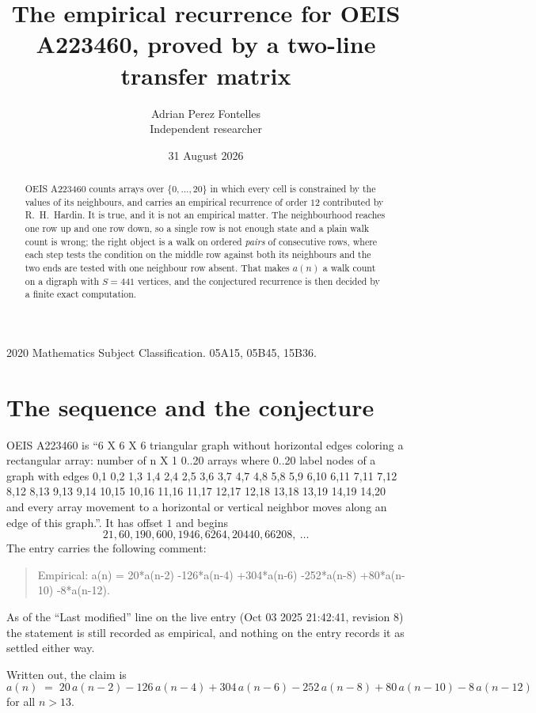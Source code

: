 \documentclass[11pt,a4paper]{article}
\title{The empirical recurrence for OEIS A223460, proved by a two-line transfer matrix}
\author{Adrian Perez Fontelles\\ \small Independent researcher}
\date{31 August 2026}
\theoremstyle{plain}
\theoremstyle{definition}
\begin{document}
\maketitle

\begin{abstract}
OEIS A223460 counts arrays over $\{0,\dots,20\}$ in which every cell is constrained by the
values of its neighbours, and carries an empirical recurrence of order $12$ contributed
by R.~H.~Hardin. It is true, and it is not an empirical matter. The neighbourhood reaches one
row up and one row down, so a single row is not enough state and a plain walk count
is wrong; the right object is a walk on ordered \emph{pairs} of consecutive rows, where
each step tests the condition on the middle row against both its neighbours and the two
ends are tested with one neighbour row absent. That makes $a(n)$ a walk count on a digraph
with $S=441$ vertices, and the conjectured recurrence is then decided by a finite exact
computation.
\end{abstract}

\noindent\small 2020 Mathematics Subject Classification. 05A15, 05B45, 15B36.\normalsize

\section{The sequence and the conjecture}

OEIS A223460 is ``6 X 6 X 6 triangular graph without horizontal edges coloring a rectangular array: number of n X 1 0..20 arrays where 0..20 label nodes of a graph with edges 0,1 0,2 1,3 1,4 2,4 2,5 3,6 3,7 4,7 4,8 5,8 5,9 6,10 6,11 7,11 7,12 8,12 8,13 9,13 9,14 10,15 10,16 11,16 11,17 12,17 12,18 13,18 13,19 14,19 14,20 and every array movement to a horizontal or vertical neighbor moves along an edge of this graph.''. It has offset $1$ and begins
\[
21, 60, 190, 600, 1946, 6264, 20440, 66208,\ \dots
\]
The entry carries the following comment:
\begin{quote}\small
Empirical: a(n) = 20*a(n-2) -126*a(n-4) +304*a(n-6) -252*a(n-8) +80*a(n-10) -8*a(n-12).
\end{quote}
As of the ``Last modified'' line on the live entry (Oct 03 2025 21:42:41, revision 8) the statement is
still recorded as empirical, and nothing on the entry records it as settled either way.

Written out, the claim is
\begin{equation}\label{eq:conj}
a(n)\;=\;20\,a(n-2) - 126\,a(n-4) + 304\,a(n-6) - 252\,a(n-8) + 80\,a(n-10) - 8\,a(n-12)
\end{equation}
for all $n>13$.
\end{document}
